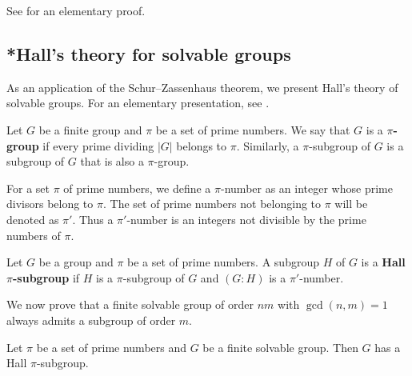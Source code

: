 See \cite{MR294497} for an elementary proof. 

\subsection{*Hall's theory for solvable groups}

As an application of the Schur--Zassenhaus theorem, 
we present Hall's theory of solvable groups. 
For an elementary presentation, see \cite{MR600654}. 

\begin{definition}
Let $G$ be a finite group and $\pi$ be a set of prime numbers. We say that 
$G$ is a \textbf{$\pi$-group} if every prime dividing $|G|$ belongs to $\pi$. 
Similarly, a $\pi$-subgroup of $G$ is a subgroup of $G$ that is also a $\pi$-group.  
\end{definition}

For a set $\pi$ of prime numbers, 
we define a $\pi$-number as an integer whose prime divisors 
belong to $\pi$. The set of prime numbers not belonging to $\pi$ will be denoted 
as $\pi'$. Thus a $\pi'$-number is an integers not divisible by 
the prime numbers of $\pi$. 

\begin{definition}
	Let $G$ be a group and $\pi$ be a set of prime numbers. A subgroup $H$ of $G$ 
    is a \textbf{Hall $\pi$-subgroup} if $H$ is a $\pi$-subgroup of $G$ and 
    $(G:H)$ is a $\pi'$-number.
\end{definition}

We now prove that a finite solvable group of order $nm$ with $\gcd(n,m)=1$ 
always admits a subgroup of order $m$. 

\begin{theorem}
 	\label{theorem:HallE}
	Let $\pi$ be a set of prime numbers and $G$ be a finite solvable group. 
    Then $G$ has a Hall $\pi$-subgroup. 
\end{theorem}

